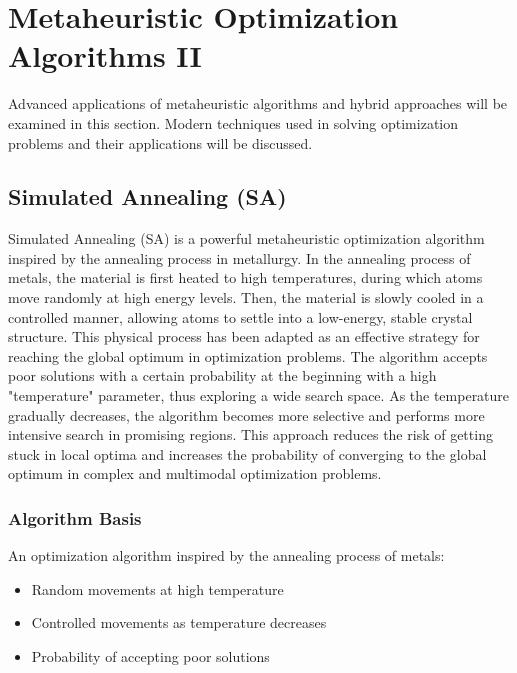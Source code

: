 \section{Metaheuristic Optimization Algorithms II}
Advanced applications of metaheuristic algorithms and hybrid approaches will be examined in this section. Modern techniques used in solving optimization problems and their applications will be discussed.

\subsection{Simulated Annealing (SA)}
Simulated Annealing (SA) is a powerful metaheuristic optimization algorithm inspired by the annealing process in metallurgy. In the annealing process of metals, the material is first heated to high temperatures, during which atoms move randomly at high energy levels. Then, the material is slowly cooled in a controlled manner, allowing atoms to settle into a low-energy, stable crystal structure. This physical process has been adapted as an effective strategy for reaching the global optimum in optimization problems. The algorithm accepts poor solutions with a certain probability at the beginning with a high "temperature" parameter, thus exploring a wide search space. As the temperature gradually decreases, the algorithm becomes more selective and performs more intensive search in promising regions. This approach reduces the risk of getting stuck in local optima and increases the probability of converging to the global optimum in complex and multimodal optimization problems.

\subsubsection{Algorithm Basis}
An optimization algorithm inspired by the annealing process of metals:
\begin{itemize}
    \item Random movements at high temperature
    \item Controlled movements as temperature decreases
    \item Probability of accepting poor solutions
\end{itemize}

